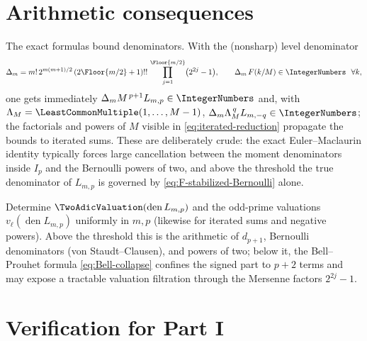 \documentclass[11pt,oneside]{article}
\numberwithin{equation}{section}
\theoremstyle{definition}
\theoremstyle{remark}
\begin{document}
\section{Arithmetic consequences}
\label{sec:arithmetic-sums}

The exact formulas bound denominators.  With the (nonsharp) level
denominator
\begin{equation}
 \Delta_m
 =m!\,2^{m(m+1)/2}\,
 (2\Floor{m/2}+1)!!\,
 \prod_{j=1}^{\Floor{m/2}}\bigl(2^{2j}-1\bigr),
 \qquad
 \Delta_m\,F(k/M)\in\IntegerNumbers\ \ \forall k,
 \label{eq:DeltaN}
\end{equation}
one gets immediately $\Delta_mM^{\,p+1}L_{m,p}\in\IntegerNumbers$ and, with
$\Lambda_M=\LeastCommonMultiple(1,\dots,M-1)$,
$\Delta_m\Lambda_M^{\,q}L_{m,-q}\in\IntegerNumbers$; the factorials and powers of
$M$ visible in \eqref{eq:iterated-reduction} propagate the bounds to
iterated sums.  These are deliberately crude: the exact
Euler--Maclaurin identity typically forces large cancellation between
the moment denominators inside $I_p$ and the Bernoulli powers of two,
and above the threshold the true denominator of $L_{m,p}$ is governed
by \eqref{eq:F-stabilized-Bernoulli} alone.

\begin{problem}
\label{prob:sharp-valuations}
Determine $\TwoAdicValuation(\operatorname{den}L_{m,p})$ and the odd-prime
valuations $v_\ell(\operatorname{den}L_{m,p})$ uniformly in $m,p$
(likewise for iterated sums and negative powers).  Above the
threshold this is the arithmetic of $d_{p+1}$, Bernoulli
denominators (von Staudt--Clausen), and powers of two; below it, the
Bell--Prouhet formula \eqref{eq:Bell-collapse} confines the signed
part to $p+2$ terms and may expose a tractable valuation filtration
through the Mersenne factors $2^{2j}-1$.
\end{problem}

\section{Verification for Part I}
\label{sec:verification-sums}
\end{document}
